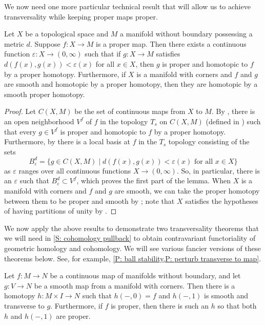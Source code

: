 We now need one more particular technical result that will allow us to achieve transversality while keeping proper maps proper.

\begin{lemma}\label{L: nearby proper homotopy}
	Let $X$ be a topological space and $M$ a manifold without boundary possessing a metric $d$.
	Suppose $f \colon X \to M$ is a proper map.
	Then there exists a continuous function $\varepsilon \colon X \to (0,\infty)$ such that if $g \colon X \to M$ satisfies $d(f(x),g(x)) < \varepsilon(x)$ for all $x \in X$, then $g$ is proper and homotopic to $f$ by a proper homotopy.
	Furthermore, if $X$ is a manifold with corners and $f$ and $g$ are smooth and homotopic by a proper homotopy, then they are homotopic by a smooth proper homotopy.
\end{lemma}

\begin{proof}
	Let $C(X,M)$ be the set of continuous maps from $X$ to $M$.
	By \cite[Proposition 9.2.28]{MaDo92}, there is an open neighborhood $V^f$ of $f$ in the topology $T_s$ on $C(X,M)$ (defined in \cite[Proposition 9.2.1]{MaDo92}) such that every $g \in V^f$ is proper and homotopic to $f$ by a proper homotopy.
	Furthermore, by \cite[Proposition 9.3.9]{MaDo92} there is a local basis at $f$ in the $T_s$ topology consisting of the sets
	$$B_\varepsilon^d = \{g \in C(X,M) \mid d(f(x),g(x)) < \varepsilon (x) \text{ for all } x \in X\}$$
	as $\varepsilon$ ranges over all continuous functions $X \to (0,\infty)$.
	So, in particular, there is an $\varepsilon$ such that $B_\varepsilon^d \subset V^f$, which proves the first part of the lemma.
	When $X$ is a manifold with corners and $f$ and $g$ are smooth, we can take the proper homotopy between them to be proper and smooth by \cite[Proposition 9.2.35]{MaDo92}; note that $X$ satisfies the hypotheses of having partitions of unity by \cite[Corollary 1.5.14]{MaDo92}.
\end{proof}


We now apply the above results to demonstrate two transversality theorems that we will need in \cref{S: cohomology pullback} to obtain contravariant functoriality of geometric homology and cohomology.
We will see various fancier versions of these theorems below.
See, for example, \cref{P: ball stability,P: perturb transverse to map}.

\begin{theorem}\label{T: basic trans}
	Let $f \colon M \to N$ be a continuous map of manifolds without boundary, and let $g \colon V \to N$ be a smooth map from a manifold with corners.
	Then there is a homotopy $h \colon M \times I \to N$ such that $h(-,0) = f$ and $h(-,1)$ is smooth and transverse to $g$.
	Furthermore, if $f$ is proper, then there is such an $h$ so that both $h$ and $h(-,1)$ are proper.
\end{theorem}

